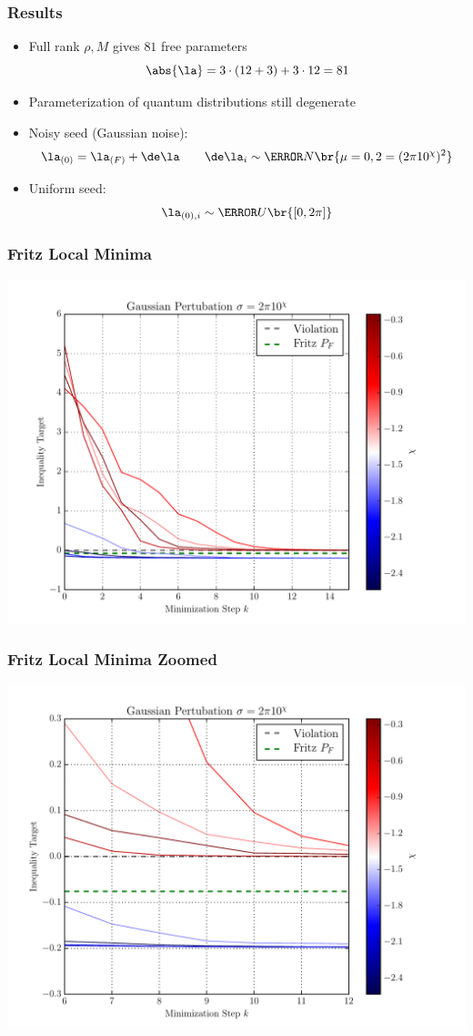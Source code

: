 \documentclass[
    hyperref={bookmarks=false},%
    xcolor={dvipsnames},
]{beamer}
\begin{document}
\begin{frame}
    \frametitle{Results}
    \begin{itemize}
        \item Full rank $\rho, M$ gives $81$ free parameters
        \[ \abs{\la} = 3 \cdot (12 + 3) + 3 \cdot 12 = 81 \]
        \item Parameterization of quantum distributions still degenerate
        \item Noisy seed (Gaussian noise):
        \[ \la_{(0)} = \la_{(F)} + \de \la \qquad \de \la_{i} \sim \s{N}\br{\mu = 0, \si^2 = (2\pi10^{\chi})^2} \]
        \item Uniform seed:
        \[ \la_{(0), i} \sim \s{U}\br{[0, 2\pi]} \]
    \end{itemize}

\end{frame}

\begin{frame}
    \frametitle{Fritz Local Minima}
    \includegraphics[width=\linewidth]{../../figures/optimizations/Gaussian_Perturbation_Fritz_Color_Default.pdf}
\end{frame}

\begin{frame}
    \frametitle{Fritz Local Minima Zoomed}
    \includegraphics[width=\linewidth]{../../figures/optimizations/Gaussian_Perturbation_Fritz_Color_Zoomed.pdf}
\end{frame}
\end{document}

